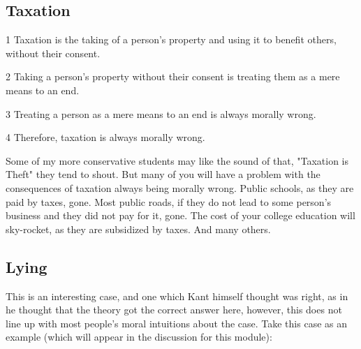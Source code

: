 \subsection{Taxation}
\begin{earg}
    \item[1] Taxation is the taking of a person’s property and using it to benefit others, without their consent.
    \item[2] Taking a person’s property without their consent is treating them as a mere means to an end.
    \item[3] Treating a person as a mere means to an end is always morally wrong.
    \item[4] Therefore, taxation is always morally wrong.
\end{earg}
Some of my more conservative students may like the sound of that, "Taxation is Theft" they tend to shout. But many of you will have a problem with the consequences of taxation always being morally wrong. Public schools, as they are paid by taxes, gone. Most public roads, if they do not lead to some person's business and they did not pay for it, gone. The cost of your college education will sky-rocket, as they are subsidized by taxes. And many others.

\subsection{Lying}

This is an interesting case, and one which Kant himself thought was right, as in he thought that the theory got the correct answer here, however, this does not line up with most people's moral intuitions about the case. Take this case as an example (which will appear in the discussion for this module):



